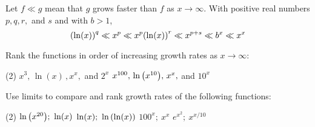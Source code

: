 \documentclass[../mathNotesPreamble]{subfiles}
\begin{document}
\begin{thmBox*}
  Let $f\ll g$ mean that $g$ grows faster than $f$ as $x\to\infty$. With positive real numbers $p,q,r,$ and $s$ and with $b>1$,
    \[{\left(\ln(x)\right)}^q\ll x^p\ll x^p{\left(\ln(x)\right)}^r\ll x^{p+s}\ll b^x\ll x^x\]
\end{thmBox*}

\begin{ex*}
  Rank the functions in order of increasing growth rates as $x\to\infty$:
\end{ex*}
\begin{tasks}[after-item-skip=\stretch{1}, label=~](2)
  \task $x^3,\,\ln(x)\,,x^x,$ and $2^x$
  \task $x^{100},\,\ln{\left(x^{10}\right)},\,x^x,$ and $10^x$
\end{tasks}

\begin{ex*}
  Use limits to compare and rank growth rates of the following functions:
\end{ex*}
\begin{tasks}[after-item-skip=\stretch{1}, label=~](2)
  \task $\ln{\left(x^{20}\right)};\ \ln(x)$
  \task $\ln(x);\ \ln{\left(\ln(x)\right)}$
  \task $100^x;\ x^x$
  \task $e^{x^2};\ x^{x/10}$
\end{tasks}
\pagebreak
\end{document}
